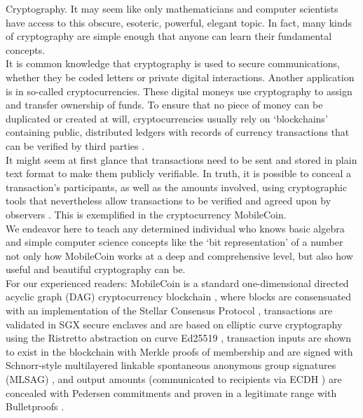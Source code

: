 

Cryptography. It may seem like only mathematicians and computer scientists have access to this obscure, esoteric, powerful, elegant topic. In fact, many kinds of cryptography are simple enough that anyone can learn their fundamental concepts.
\\ \newline
It is common knowledge that cryptography is used to secure communications, whether they be coded letters or private digital interactions. Another application is in so-called cryptocurrencies. These digital moneys use cryptography to assign and transfer ownership of funds. To ensure that no piece of money can be duplicated or created at will, cryptocurrencies usually rely on `blockchains' containing public, distributed ledgers with records of currency transactions that can be verified by third parties \cite{Nakamoto_bitcoin}.
\\ \newline
It might seem at first glance that transactions need to be sent and stored in plain text format to make them publicly verifiable. In truth, it is possible to conceal a transaction's participants, as well as the amounts involved, using cryptographic tools that nevertheless allow transactions to be verified and agreed upon by observers \cite{cryptoNoteWhitePaper}. This is exemplified in the cryptocurrency MobileCoin.
\\ \newline
We endeavor here to teach any determined individual who knows basic algebra and simple computer science concepts like the `bit representation' of a number not only how MobileCoin works at a deep and comprehensive level, but also how useful and beautiful cryptography can be.
\\ \newline
For our experienced readers: MobileCoin is a standard one-dimensional directed acyclic graph (DAG) cryptocurrency blockchain \cite{Nakamoto_bitcoin}, where blocks are consensuated with an implementation of the Stellar Consensus Protocol \cite{stellar-consensus-protocol}, transactions are validated in SGX secure enclaves \cite{intel-sgx-explained-advanced} and are based on elliptic curve cryptography using the Ristretto abstraction \cite{ristretto} on curve Ed25519 \cite{Bernstein2012-high-speed-high-security-ed25519}, transaction inputs are shown to exist in the blockchain with Merkle proofs of membership \cite{merkle-tree} and are signed with Schnorr-style multilayered linkable spontaneous anonymous group signatures (MLSAG) \cite{MRL-0005-ringct}, and output amounts (communicated to recipients via ECDH \cite{Diffie-Hellman}) are concealed with Pedersen commitments \cite{maxwell-ct-2} and proven in a legitimate range with Bulletproofs \cite{Bulletproofs_paper}.